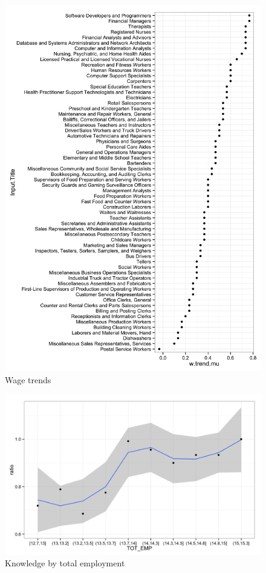 \documentclass[11pt]{article}
\begin{document}
\begin{figure}
\caption{Wage trends} 
\centering
\begin{minipage}{0.85 \linewidth}
\includegraphics[width = \linewidth]{./plots/wage_trends.png}
\end{minipage}  
\end{figure} 


\begin{figure}
\caption{Knowledge by total employment} 
\centering
\begin{minipage}{0.85 \linewidth}
\includegraphics[width = \linewidth]{./plots/knowledge_emp.png}
\end{minipage}  
\end{figure} 
\end{document}
